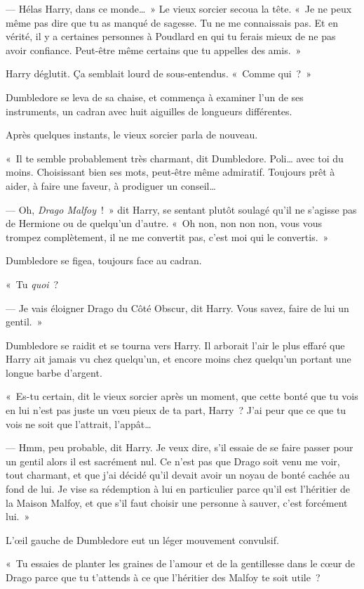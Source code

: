 --- Hélas Harry, dans ce monde…~» Le vieux sorcier secoua la tête. «~Je ne peux même pas dire que tu as manqué de sagesse. Tu ne me connaissais pas. Et en vérité, il y a certaines personnes à Poudlard en qui tu ferais mieux de ne pas avoir confiance. Peut-être même certains que tu appelles des amis.~»

Harry déglutit. Ça semblait lourd de sous-entendus. «~Comme qui~?~»

Dumbledore se leva de sa chaise, et commença à examiner l'un de ses instruments, un cadran avec huit aiguilles de longueurs différentes.

Après quelques instants, le vieux sorcier parla de nouveau.

«~Il te semble probablement très charmant, dit Dumbledore. Poli… avec toi du moins. Choisissant bien ses mots, peut-être même admiratif. Toujours prêt à aider, à faire une faveur, à prodiguer un conseil…

--- Oh, \emph{Drago Malfoy}~!~» dit Harry, se sentant plutôt soulagé qu'il ne s'agisse pas de Hermione ou de quelqu'un d'autre. «~Oh non, non non non, vous vous trompez complètement, il ne me convertit pas, c'est moi qui le convertis.~»

Dumbledore se figea, toujours face au cadran.

«~Tu \emph{quoi}~?

--- Je vais éloigner Drago du Côté Obscur, dit Harry. Vous savez, faire de lui un gentil.~»

Dumbledore se raidit et se tourna vers Harry. Il arborait l'air le plus effaré que Harry ait jamais vu chez quelqu'un, et encore moins chez quelqu'un portant une longue barbe d'argent.

«~Es-tu certain, dit le vieux sorcier après un moment, que cette bonté que tu vois en lui n'est pas juste un vœu pieux de ta part, Harry~? J'ai peur que ce que tu vois ne soit que l'attrait, l'appât…

--- Hmm, peu probable, dit Harry. Je veux dire, s'il essaie de se faire passer pour un gentil alors il est sacrément nul. Ce n'est pas que Drago soit venu me voir, tout charmant, et que j'ai décidé qu'il devait avoir un noyau de bonté cachée au fond de lui. Je vise sa rédemption à lui en particulier parce qu'il est l'héritier de la Maison Malfoy, et que s'il faut choisir une personne à sauver, c'est forcément lui.~»

L'œil gauche de Dumbledore eut un léger mouvement convulsif.

«~Tu essaies de planter les graines de l'amour et de la gentillesse dans le cœur de Drago parce que tu t'attends à ce que l'héritier des Malfoy te soit utile~?

